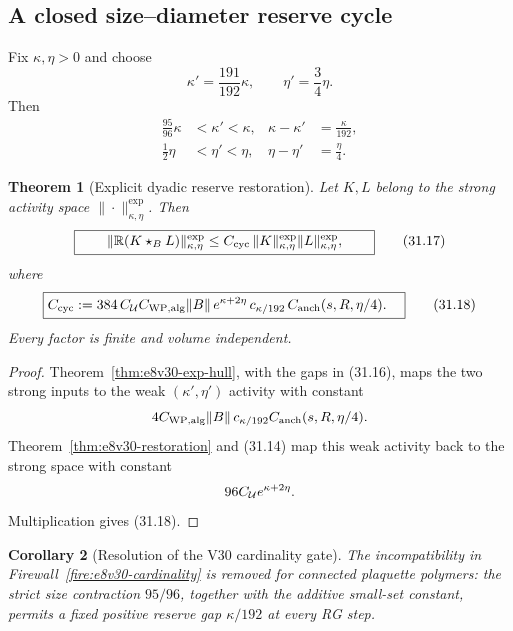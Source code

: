 \documentclass[11pt,oneside]{book}
\newtheorem{theorem}{Theorem}[chapter]
\newtheorem{corollary}[theorem]{Corollary}
\theoremstyle{definition}
\theoremstyle{remark}
\begin{document}
\subsection{A closed size--diameter reserve cycle}

Fix \(\kappa,\eta>0\) and choose
\[
                     \kappa'=\frac{191}{192}\kappa,\qquad
                     \eta'=\frac34\eta.                           \tag{31.15}
\]
Then
\[
\begin{split}
 \frac{95}{96}\kappa
 &<\kappa'<\kappa,&
 \kappa-\kappa'&=\frac{\kappa}{192},\\
 \frac12\eta
 &<\eta'<\eta,&
 \eta-\eta'&=\frac{\eta}{4}.                                    \tag{31.16}
\end{split}
\]

\begin{theorem}[Explicit dyadic reserve restoration]
\label{thm:e8v31-reserve-restoration}
Let \(K,L\) belong to the strong activity space
\(\|\cdot\|_{\kappa,\eta}^{\exp}\).  Then
\[
\boxed{\qquad
 \|{\mathbb R}(K\star_BL)\|_{\kappa,\eta}^{\exp}
 \leq C_{\rm cyc}\,
 \|K\|_{\kappa,\eta}^{\exp}
 \|L\|_{\kappa,\eta}^{\exp},
\qquad}                                                           \tag{31.17}
\]
where
\[
\boxed{
\begin{split}
 C_{\rm cyc}:={}&
 384\,C_{\cal U}C_{\rm WP,alg}\|B\|\,
 e^{\kappa+2\eta}\,
 c_{\kappa/192}\,
 C_{\rm anch}(s,R,\eta/4).
\end{split}}                                                     \tag{31.18}
\]
Every factor is finite and volume independent.
\end{theorem}

\begin{proof}
Theorem~\ref{thm:e8v30-exp-hull}, with the gaps in (31.16), maps the
two strong inputs to the weak \((\kappa',\eta')\) activity with
constant
\[
 4C_{\rm WP,alg}\|B\|\,
 c_{\kappa/192}C_{\rm anch}(s,R,\eta/4).
\]
Theorem~\ref{thm:e8v30-restoration} and (31.14) map this weak activity
back to the strong space with constant
\[
 96C_{\cal U}e^{\kappa+2\eta}.
\]
Multiplication gives (31.18).
\end{proof}

\begin{corollary}[Resolution of the V30 cardinality gate]
\label{cor:e8v31-cardinality-closed}
The incompatibility in
Firewall~\ref{fire:e8v30-cardinality} is removed for connected
plaquette polymers: the strict size contraction \(95/96\), together
with the additive small-set constant, permits a fixed positive
reserve gap \(\kappa/192\) at every RG step.
\end{corollary}
\end{document}
